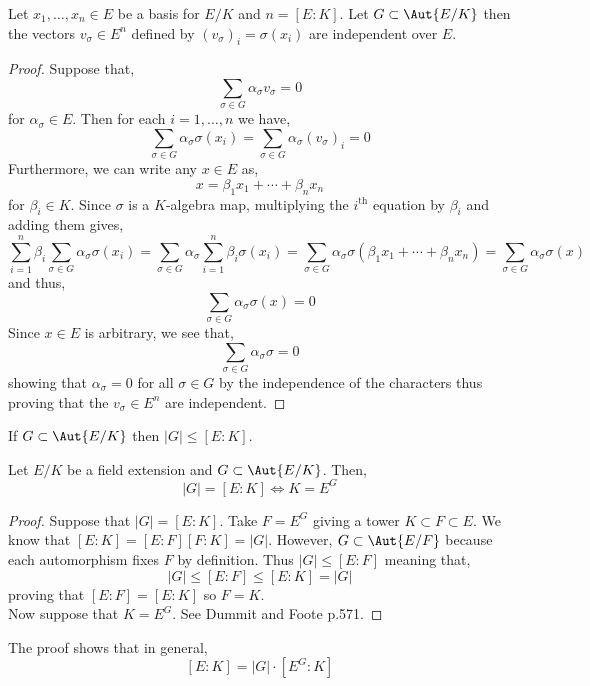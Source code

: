 \documentclass[12pt]{article}
\begin{document}
\begin{cor}
Let $x_1, \dots, x_n \in E$ be a basis for $E / K$ and $n = [E : K]$. Let $G \subset \Aut{E/K}$ then the vectors $v_\sigma \in E^n$ defined by $(v_\sigma)_i = \sigma(x_i)$ are independent over $E$.
\end{cor}

\begin{proof}
Suppose that,
\[ \sum_{\sigma \in G} \alpha_\sigma v_\sigma = 0 \]
for $\alpha_\sigma \in E$. Then for each $i = 1,\dots,n$ we have,
\[ \sum_{\sigma \in G} \alpha_\sigma \sigma(x_i) = \sum_{\sigma \in G} \alpha_\sigma (v_\sigma)_i = 0 \]
Furthermore, we can write any $x \in E$ as,
\[ x = \beta_1 x_1 + \cdots + \beta_n x_n \]
for $\beta_i \in K$. Since $\sigma$ is a $K$-algebra map, multiplying the $i^{\text{th}}$ equation by $\beta_i$ and adding them gives,
\[ \sum_{i = 1}^n \beta_i \sum_{\sigma \in G} \alpha_\sigma \sigma(x_i) = \sum_{\sigma \in G} \alpha_\sigma \sum_{i = 1}^n \beta_i \sigma(x_i) = \sum_{\sigma \in G} \alpha_\sigma \sigma(\beta_1 x_1 + \cdots + \beta_n x_n) = \sum_{\sigma \in G} \alpha_\sigma \sigma(x) \]
and thus,
\[ \sum_{\sigma \in G} \alpha_\sigma \sigma(x) = 0 \]
Since $x \in E$ is arbitrary, we see that,
\[ \sum_{\sigma \in G} \alpha_\sigma \sigma = 0 \]
showing that $\alpha_\sigma = 0$ for all $\sigma \in G$ by the independence of the characters thus proving that the $v_\sigma \in E^n$ are independent. 
\end{proof}

\begin{cor}
If $G \subset \Aut{E/K}$ then $|G| \le [E : K]$.
\end{cor}

\begin{prop}
Let $E/K$ be a field extension and $G \subset \Aut{E/K}$. Then,
\[ |G| = [E : K] \iff K = E^G \]
\end{prop}

\begin{proof}
Suppose that $|G| = [E : K]$. Take $F = E^G$ giving a tower $K \subset F \subset E$. We know that $[E : K] = [E : F][F : K] = |G|$. However, $G \subset \Aut{E/F}$ because each automorphism fixes $F$ by definition. Thus $|G| \le [E : F]$ meaning that,
\[ |G| \le [E : F] \le [E : K] = |G| \]
proving that $[E : F] = [E : K]$ so $F = K$.
\bigskip\\
Now suppose that $K = E^G$. See Dummit and Foote p.571.
\end{proof}

\begin{rmk}
The proof shows that in general,
\[ [E : K] = |G| \cdot [E^G : K] \]
\end{rmk}
\end{document}
